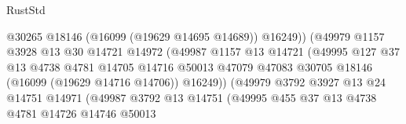 \begin{lexlean}{RustStd}
\begin{coremodule}
                                            @30265
                                            @18146
                                            (@16099 (@19629 @14695 @14689))
                                            @16249))
                                        (@49979
                                          @1157
                                          @3928
                                          @13
                                          @30
                                          @14721
                                          @14972
                                          (@49987
                                            @1157
                                            @13
                                            @14721
                                            (@49995
                                              @127
                                              @37
                                              @13
                                              @4738
                                              @4781
                                              @14705
                                              @14716
                                              @50013
                                              @47079
                                              @47083
                                              @30705
                                              @18146
                                              (@16099 (@19629 @14716 @14706))
                                              @16249))
                                          (@49979
                                            @3792
                                            @3927
                                            @13
                                            @24
                                            @14751
                                            @14971
                                            (@49987
                                              @3792
                                              @13
                                              @14751
                                              (@49995
                                                @455
                                                @37
                                                @13
                                                @4738
                                                @4781
                                                @14726
                                                @14746
                                                @50013

\end{coremodule}
\end{lexlean}
